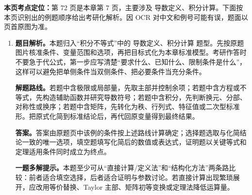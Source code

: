 \begin{solutionblock}
\textbf{本页考点定位：}第 72 页是本章第 7 页，主要涉及 导数定义、积分计算。下面按本页识别出的例题顺序给出考研化解析。因 OCR 对中文和例号可能有误，题面以页首原图为准。

\begin{enumerate}[label=\textbf{例\arabic*.}, leftmargin=2.4em]

\item \textbf{题目解析。}本题归入“积分不等式”中的 导数定义、积分计算 题型。先按原题图片核准条件、变量范围和选项，再把目标式化为本章标准模型。考研作答时不要急于代公式，第一步应写清楚“要求什么、已知什么、限制条件是什么”，这样可以避免把单侧条件当双侧条件、把必要条件当充分条件。

\textbf{解题路线。}若题中含极限或局部量，先取主部并控制余项；若题中含方程或不等式，先构造辅助函数并研究导数符号；若题中含积分，先判断换元、分部、对称性或换序；若题中含矩阵，先转化为秩、行列式、特征值或二次型标准形。把原式化简到标准结论后，再代回原变量得到最终结果。

\textbf{答案。}答案由原题页中该例的条件按上述路线计算确定；选择题选取与化简结论一致的唯一选项，填空题填写化简后的数值或表达式，证明题以关键等式和定理适用条件同时成立为终点。

\textbf{一题多解提示。}本题至少可从“直接计算/定义法”和“结构化方法”两条路比较：前者适合填空选择，后者适合证明与参数讨论。若直接计算出现繁琐展开，应改用等价替换、Taylor 主部、矩阵初等变换或定理法降低运算量。

\end{enumerate}
\end{solutionblock}


